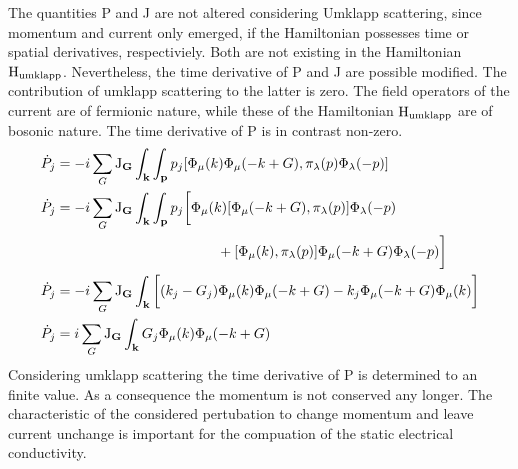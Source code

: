 The quantities P and J are not altered considering Umklapp scattering, since momentum and current only emerged, if the Hamiltonian possesses time or spatial derivatives, respectiviely.
Both are not existing in the Hamiltonian $\mathrm{H}_{\mathrm{umklapp}}$.
Nevertheless, the time derivative of P and J are possible modified.
The contribution of umklapp scattering to the latter is zero. 
The field operators of the current are of fermionic nature, while these of the Hamiltonian $\mathrm{H}_{\mathrm{umklapp}}$ are of bosonic nature.
The time derivative of P is in contrast non-zero.
%
\begin{align}
	\dot{P}_{j} &= -i \sum\limits_{G} \mt{J}_{\vb{G}} 
		\int_{\vb{k}} \int_{\vb{p}}
		p_{j}
		\comm{\Phi_{\mu}(k) \Phi_{\mu}(-k+G)}{\pi_{\lambda}(p) \Phi_{\lambda}(-p)}
	\notag \\
	\dot{P}_{j} &= -i \sum\limits_{G} \mt{J}_{\vb{G}} 
		\int_{\vb{k}} \int_{\vb{p}} 
		p_{j} \bigg[
			\Phi_{\mu}(k) \comm{\Phi_{\mu}(-k+G)}{\pi_{\lambda}(p)} \Phi_{\lambda}(-p)
			\notag \\ &\hspace{4.05cm}+
			\comm{\Phi_{\mu}(k)}{\pi_{\lambda}(p)} \Phi_{\mu}(-k+G) \Phi_{\lambda}(-p)
		\bigg]
	\notag \\
	\dot{P}_{j} &= -i \sum\limits_{G} \mt{J}_{\vb{G}} 
		\int_{\vb{k}} 
		\bigg[
			(k_{j} - G_{j}) \Phi_{\mu}(k) \Phi_{\mu}(-k+G)
			-
			k_{j} \Phi_{\mu}(-k+G) \Phi_{\mu}(k)
		\bigg]
	\notag \\
	\dot{P}_{j} &= i \sum\limits_{G} \mt{J}_{\vb{G}} 
		\int_{\vb{k}} G_{j} \Phi_{\mu}(k) \Phi_{\mu}(-k+G)
	\label{appeq:time derivative momentum}
\end{align}
%
Considering umklapp scattering the time derivative of P is determined to an finite value.
As a consequence the momentum is not conserved any longer.
The characteristic of the considered pertubation to change momentum and leave current unchange is important for the compuation of the static electrical conductivity.










































































